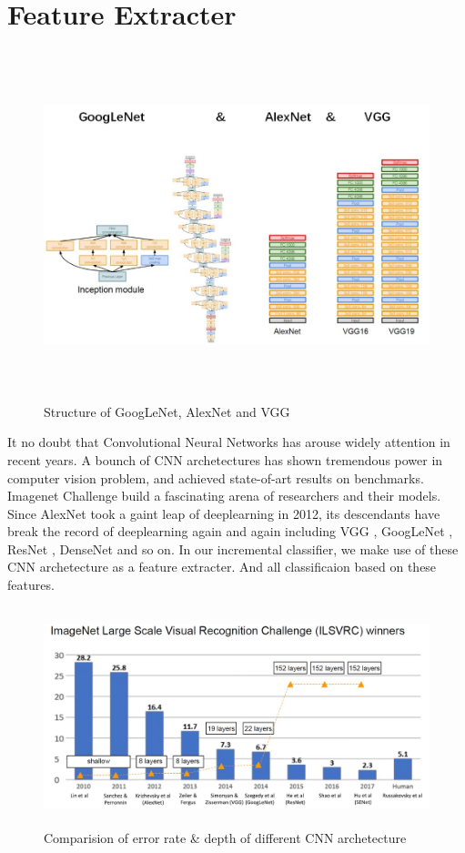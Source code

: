 \documentclass[12pt]{report}
\begin{document}
\section{Feature Extracter}
\begin{figure}
	\includegraphics[height = 4in, width = 5in]{5.jpg}
	\caption{Structure of GoogLeNet, AlexNet and VGG}
	\label{fig5}
\end{figure}
\par It no doubt that Convolutional Neural Networks has arouse widely attention in recent years. A bounch of CNN archetectures has shown tremendous power in computer vision problem, and achieved state-of-art results on benchmarks. Imagenet Challenge\cite{imagenet} build a fascinating arena of researchers and their models. Since AlexNet \cite{alexnet} took a gaint leap of deeplearning in 2012, its descendants have break the record of deeplearning again and again including VGG \cite{vgg}, GoogLeNet \cite{googlenet}, ResNet \cite{resnet}, DenseNet \cite{densenet}and so on. In our incremental classifier, we make use of these CNN archetecture as a feature extracter. And all classificaion based on these features.
\begin{figure}
	\includegraphics[height = 2.5in, width = 5in]{3.jpg}
	\caption{Comparision of error rate \& depth of different CNN archetecture}
	\label{fig3}
\end{figure}
\end{document}
